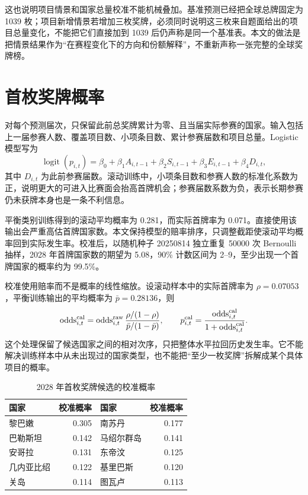\documentclass[UTF8,11pt,a4paper]{ctexart}
\begin{document}
这也说明项目情景和国家总量校准不能机械叠加。基准预测已经把全球总牌固定为 1039 枚；项目新增情景若增加三枚奖牌，必须同时说明这三枚来自题面给出的项目总量变化，不能把它们直接加到 1039 后仍声称是同一个基准表。本文的做法是把情景结果作为“在赛程变化下的方向和份额解释”，不重新声称一张完整的全球奖牌榜。

\label{mcm-q1-end}
\label{mcm-q2-start}
\label{mcm-q3-end}
\section{首枚奖牌概率}

对每个预测届次，只保留此前总奖牌累计为零、且当届实际参赛的国家。输入包括上一届参赛人数、覆盖项目数、小项条目数、累计参赛届数和项目总量。Logistic 模型写为
\begin{equation}
\operatorname{logit}(p_{i,t})=\beta_0+\beta_1A_{i,t-1}
+\beta_2S_{i,t-1}+\beta_3E_{i,t-1}+\beta_4D_{i,t},
\end{equation}
其中 $D_{i,t}$ 为此前参赛届数。滚动训练中，小项条目数和参赛人数的标准化系数为正，说明更大的可进入比赛面会抬高首牌机会；参赛届数系数为负，表示长期参赛仍未获牌本身也是一条不利信息。

平衡类别训练得到的滚动平均概率为 0.281，而实际首牌率为 0.071。直接使用该输出会严重高估首牌国家数。本文保持模型的赔率排序，只调整截距使滚动平均概率回到实际发生率。校准后，以随机种子 20250814 独立重复 50000 次 Bernoulli 抽样，2028 年首牌国家数的期望为 5.08，90\% 计数区间为 2--9，至少出现一个首牌国家的概率约为 99.5\%。

校准使用赔率而不是概率的线性缩放。设滚动样本中的实际首牌率为 $\rho=0.07053$，平衡训练输出的平均概率为 $\bar p=0.28136$，则
\begin{equation}
\operatorname{odds}^{\rm cal}_{i,t}=\operatorname{odds}^{\rm raw}_{i,t}
\frac{\rho/(1-\rho)}{\bar p/(1-\bar p)},\qquad
p^{\rm cal}_{i,t}=\frac{\operatorname{odds}^{\rm cal}_{i,t}}
{1+\operatorname{odds}^{\rm cal}_{i,t}}.
\end{equation}
这个处理保留了候选国家之间的相对次序，只把整体水平拉回历史发生率。它不能解决训练样本中从未出现过的国家类型，也不能把“至少一枚奖牌”拆解成某个具体项目的概率。

\begin{table}[H]
\centering
\caption{2028 年首枚奖牌候选的校准概率}
\label{tab:first-medal-top}
\small
\begin{tabular}{lrlr}
\toprule
国家 & 校准概率 & 国家 & 校准概率\\
\midrule
黎巴嫩 & 0.305 & 南苏丹 & 0.177\\
巴勒斯坦 & 0.142 & 马绍尔群岛 & 0.141\\
安哥拉 & 0.131 & 东帝汶 & 0.125\\
几内亚比绍 & 0.122 & 基里巴斯 & 0.120\\
关岛 & 0.114 & 图瓦卢 & 0.113\\
\bottomrule
\end{tabular}
\end{table}
\end{document}
